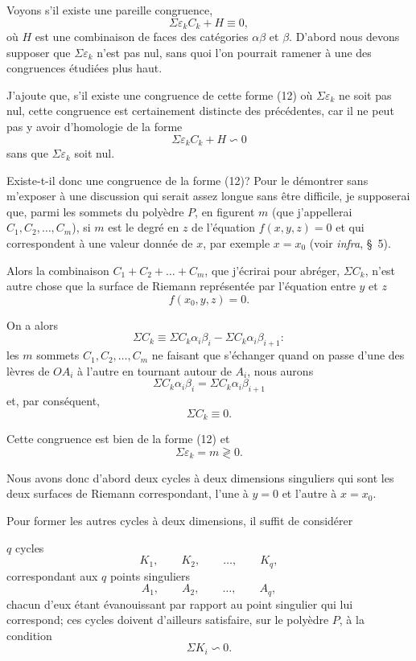 \documentclass{article}
\begin{document}
Voyons s'il existe une pareille congruence,
\[ \Sigma \varepsilon_{k} C_{k} + H \equiv 0, \tag{12} \]
où $H$ est une combinaison de faces des catégories $\alpha\beta$ et $\beta$. D'abord nous devons supposer que $\Sigma \varepsilon_{k}$ n'est pas nul, sans quoi l'on pourrait ramener à une des congruences étudiées plus haut.


J'ajoute que, s'il existe une congruence de cette forme (12) où $\Sigma \varepsilon_{k}$ ne soit pas nul, cette congruence est certainement distincte des précédentes, car il ne peut pas y avoir d'homologie de la forme
\[ \Sigma \varepsilon_{k} C_{k} + H \backsim 0 \tag{13} \]
sans que $\Sigma \varepsilon_{k}$ soit nul.

Existe-t-il donc une congruence de la forme (12)? Pour le démontrer sans m'exposer à une discussion qui serait assez longue sans être difficile, je supposerai que, parmi les sommets du polyèdre $P$, en figurent $m$ (que j'appellerai $C_{1}, C_{2}, \ldots, C_{m}$), si $m$ est le degré en $z$ de l'équation $f(x, y, z) = 0$ et qui correspondent à une valeur donnée de $x$, par exemple $x = x_{0}$ (voir \emph{infra}, \S~5).

Alors la combinaison $C_{1} + C_{2} + \ldots + C_{m}$, que j'écrirai pour abréger, $\Sigma C_{k}$, n'est autre chose que la surface de Riemann représentée par l'équation entre $y$ et $z$
\[ f(x_{0}, y, z) = 0. \]

On a alors
\[ \Sigma C_{k} \equiv \Sigma C_{k} \alpha_{i}\beta_{i} - \Sigma C_{k} \alpha_{i}\beta_{i+1}: \]
les $m$ sommets $C_{1}, C_{2}, \ldots, C_{m}$ ne faisant que s'échanger quand on passe d'une des lèvres de $OA_{i}$ à l'autre en tournant autour de $A_{i}$, nous aurons
\[ \Sigma C_{k} \alpha_{i}\beta_{i} = \Sigma C_{k} \alpha_{i}\beta_{i+1} \]
et, par conséquent,
\[ \Sigma C_{k} \equiv 0. \]

Cette congruence est bien de la forme (12) et
\[ \Sigma \varepsilon_{k} = m \gtrless 0. \]

Nous avons donc d'abord deux cycles à deux dimensions singuliers qui sont les deux surfaces de Riemann correspondant, l'une à $y = 0$ et l'autre à $x = x_{0}$.

Pour former les autres cycles à deux dimensions, il suffit de considérer

$q$ cycles
\[ K_{1}, \qquad K_{2}, \qquad \ldots, \qquad K_{q}, \]
correspondant aux $q$ points singuliers
\[ A_{1}, \qquad A_{2}, \qquad \ldots, \qquad A_{q}, \]
chacun d'eux étant évanouissant par rapport au point singulier qui lui correspond; ces cycles doivent d'ailleurs satisfaire, sur le polyèdre $P$, à la condition
\[ \Sigma K_{i} \backsim 0. \]
\end{document}
